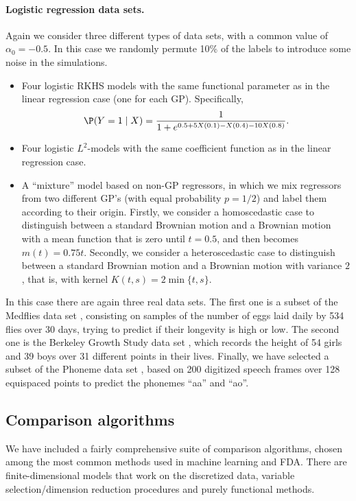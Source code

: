 \paragraph{Logistic regression data sets.} Again we consider three different types of data sets,  with a common value of \(\alpha_0=-0.5\). In this case we randomly permute 10\% of the labels to introduce some noise in the simulations.
\begin{itemize}
  \item Four logistic RKHS models with the same functional parameter as in the linear regression case (one for each GP). Specifically,
  \[
  \P(Y=1\mid X) = \frac{1}{1 + e^{0.5 +5X(0.1) - X(0.4) - 10X(0.8)}}.
  \]
  \item Four logistic \(L^2\)-models with the same coefficient function as in the linear regression case.
  \item A ``mixture'' model based on non-GP regressors, in which we mix regressors from two different GP's (with equal probability \(p=1/2\)) and label them according to their origin. Firstly, we consider a homoscedastic case to distinguish between a standard Brownian motion and a Brownian motion with a mean function that is zero until \(t=0.5\), and then becomes \(m(t)=0.75t\). Secondly, we consider a heteroscedastic case to distinguish between a standard Brownian motion and a Brownian motion with variance \(2\), that is, with kernel \(K(t,s)=2\min\{t,s\}\).
\end{itemize}
In this case there are again three real data sets. The first one is a subset of the Medflies data set \citep{carey1998relationship}, consisting on samples of the number of eggs laid daily by 534 flies over 30 days, trying to predict if their longevity is high or low. The second one is the Berkeley Growth Study data set \citep{tuddenham1954physical}, which records the height of 54 girls and 39 boys over 31 different points in their lives. Finally, we have selected a subset of the Phoneme data set \citep{hastie1995penalized}, based on 200 digitized speech frames over 128 equispaced points to predict the phonemes ``aa'' and ``ao''.

\subsection*{Comparison algorithms}

We have included a fairly comprehensive suite of comparison algorithms, chosen among the most common methods used in machine learning and FDA. There are finite-dimensional models that work on the discretized data, variable selection/dimension reduction procedures and purely functional methods.

